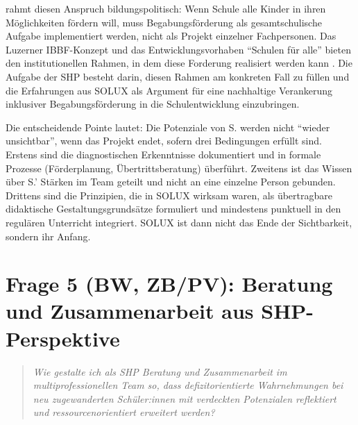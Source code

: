 \documentclass[ngerman, a4paper]{article}
\begin{document}
\textcite{muelleroppliger2021plurale} rahmt diesen Anspruch bildungspolitisch: Wenn Schule alle
Kinder in ihren Möglichkeiten fördern will, muss Begabungsförderung als
gesamtschulische Aufgabe implementiert werden, nicht als Projekt einzelner
Fachpersonen. Das Luzerner
IBBF-Konzept und das Entwicklungsvorhaben \enquote{Schulen für alle} bieten
den institutionellen Rahmen, in dem diese Forderung realisiert werden kann
\parencite{dvs2025bbf}. Die Aufgabe der SHP besteht darin, diesen Rahmen
am konkreten Fall zu füllen und die Erfahrungen aus SOLUX als Argument für
eine nachhaltige Verankerung inklusiver Begabungsförderung in die
Schulentwicklung einzubringen.

Die entscheidende Pointe lautet: Die Potenziale von S. werden nicht
\enquote{wieder unsichtbar}, wenn das Projekt endet, sofern drei Bedingungen
erfüllt sind. Erstens sind die diagnostischen Erkenntnisse dokumentiert und
in formale Prozesse (Förderplanung, Übertrittsberatung) überführt. Zweitens
ist das Wissen über S.' Stärken im Team geteilt und nicht an eine einzelne
Person gebunden. Drittens sind die Prinzipien, die in SOLUX wirksam waren,
als übertragbare didaktische Gestaltungsgrundsätze formuliert und mindestens
punktuell in den regulären Unterricht integriert. SOLUX ist dann nicht das
Ende der Sichtbarkeit, sondern ihr Anfang.

\newpage
\section{Frage 5 (BW, ZB/PV): Beratung und Zusammenarbeit aus SHP-Perspektive}
\label{sec:frage5}
 
\begin{quote}\itshape
Wie gestalte ich als SHP Beratung und Zusammenarbeit im multiprofessionellen
Team so, dass defizitorientierte Wahrnehmungen bei neu zugewanderten
Schüler:innen mit verdeckten Potenzialen reflektiert und ressourcenorientiert
erweitert werden?
\end{quote}
\end{document}
